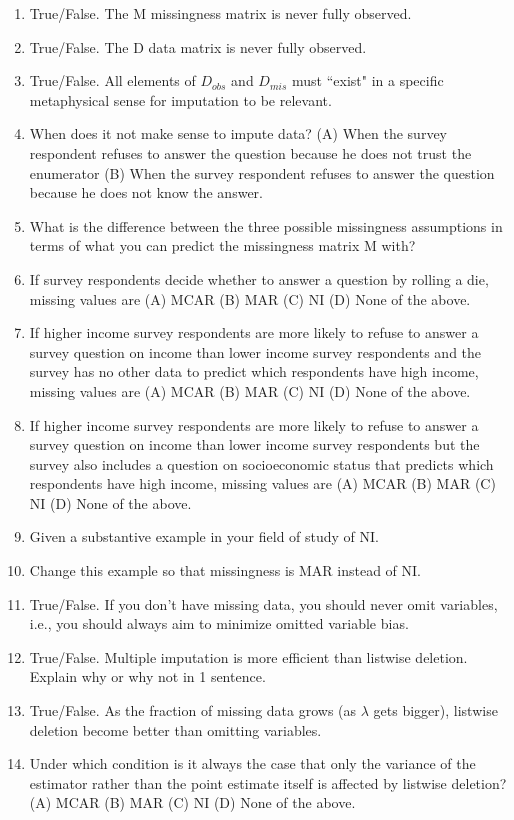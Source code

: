 \documentclass[11pt]{article}
\begin{document}
\begin{enumerate}
\item True/False. The M missingness matrix is never fully observed.
\item True/False. The D data matrix is never fully observed.
\item True/False. All elements of $D_{obs}$ and $D_{mis}$ must ``exist" in a specific metaphysical sense for imputation to be relevant. %
\item When does it not make sense to impute data? (A) When the survey respondent refuses to answer the question because he does not trust the enumerator (B) When the survey respondent refuses to answer the question because he does not know the answer.
\item What is the difference between the three possible missingness assumptions in terms of what you can predict the missingness matrix M with?
\item If survey respondents decide whether to answer a question by rolling a die, missing values are (A) MCAR (B) MAR (C) NI (D) None of the above.
\item If higher income survey respondents are more likely to refuse to answer a survey question on income than lower income survey respondents and the survey has no other data to predict which respondents have high income, missing values are (A) MCAR (B) MAR (C) NI (D) None of the above.
\item If higher income survey respondents are more likely to refuse to answer a survey question on income than lower income survey respondents but the survey also includes a question on socioeconomic status that predicts which respondents have high income, missing values are (A) MCAR (B) MAR (C) NI (D) None of the above.
\item Given a substantive example in your field of study of NI.
\item Change this example so that missingness is MAR instead of NI.
\item True/False. If you don't have missing data, you should never omit variables, i.e., you should always aim to minimize omitted variable bias.
\item True/False. Multiple imputation is more efficient than listwise deletion. Explain why or why not in 1 sentence.
\item True/False. As the fraction of missing data grows (as $\lambda$ gets bigger), listwise deletion become better than omitting variables.
\item Under which condition is it always the case that only the variance of the estimator rather than the point estimate itself is affected by listwise deletion? (A) MCAR (B) MAR (C) NI (D) None of the above.
\end{enumerate}
\end{document}

